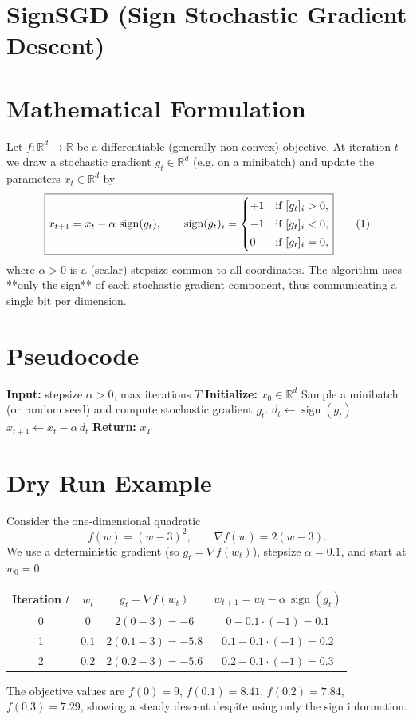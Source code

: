 \documentclass[11pt]{article}
\newcommand{\sign}{\operatorname{sign}}
\newcommand{\RR}{\mathbb{R}}
\begin{document}
\section*{SignSGD (Sign Stochastic Gradient Descent)}

\section*{Mathematical Formulation}
Let $f:\RR^{d}\rightarrow\RR$ be a differentiable (generally non‑convex) objective.  
At iteration $t$ we draw a stochastic gradient $g_t\in\RR^{d}$ (e.g. on a minibatch) and update the parameters $x_t\in\RR^{d}$ by
\[
\boxed{%
x_{t+1}=x_{t}-\alpha\,\sign(g_t),\qquad 
\sign(g_t)_i=
\begin{cases}
+1 & \text{if }[g_t]_i>0,\\[2pt]
-1 & \text{if }[g_t]_i<0,\\[2pt]
0  & \text{if }[g_t]_i=0,
\end{cases}
}
\tag{1}
\]
where $\alpha>0$ is a (scalar) stepsize common to all coordinates.  
The algorithm uses **only the sign** of each stochastic gradient component, thus communicating a single bit per dimension.

\section*{Pseudocode}
\begin{algorithm}[H]
\caption{SignSGD}
\begin{algorithmic}[1]
\STATE \textbf{Input:} stepsize $\alpha>0$, max iterations $T$
\STATE \textbf{Initialize:} $x_0\in\RR^{d}$
    \STATE Sample a minibatch (or random seed) and compute stochastic gradient $g_t$.
    \STATE $d_t\gets\sign(g_t)$                     
    \STATE $x_{t+1}\gets x_t-\alpha\,d_t$          
\ENDFOR
\STATE \textbf{Return:} $x_T$
\end{algorithmic}
\end{algorithm}

\section*{Dry Run Example}
Consider the one‑dimensional quadratic
\[
f(w)=(w-3)^2,\qquad \nabla f(w)=2(w-3).
\]
We use a deterministic gradient (so $g_t=\nabla f(w_t)$), stepsize $\alpha=0.1$, and start at $w_0=0$.

\begin{center}
\begin{tabular}{c|c|c|c}
Iteration $t$ & $w_t$ & $g_t= \nabla f(w_t)$ & $w_{t+1}=w_t-\alpha\,\sign(g_t)$\\\midrule
0 & $0$   & $2(0-3)=-6$ & $0-0.1\cdot(-1)=0.1$\\
1 & $0.1$ & $2(0.1-3)=-5.8$ & $0.1-0.1\cdot(-1)=0.2$\\
2 & $0.2$ & $2(0.2-3)=-5.6$ & $0.2-0.1\cdot(-1)=0.3$\\
\end{tabular}
\end{center}
The objective values are $f(0)=9$, $f(0.1)=8.41$, $f(0.2)=7.84$, $f(0.3)=7.29$, showing a steady descent despite using only the sign information.
\end{document}
